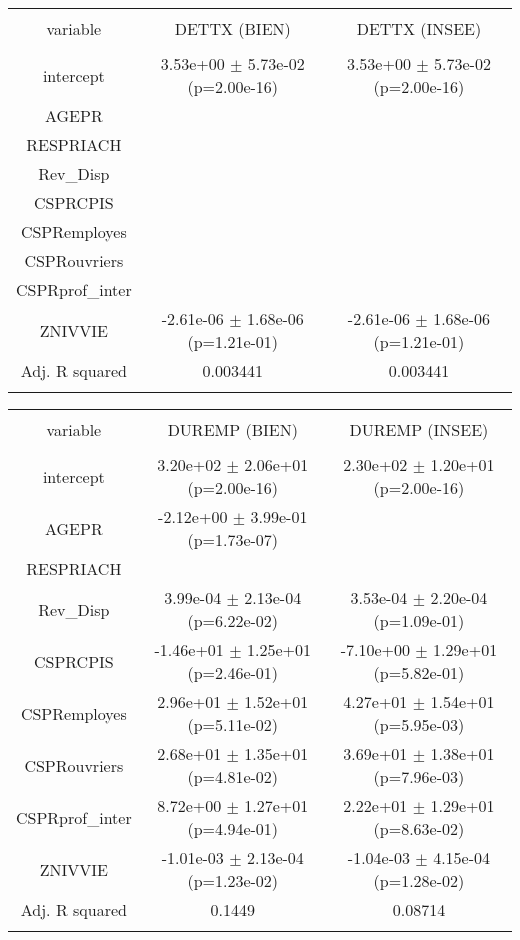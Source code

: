 \begin{table*}[!htbp] \centering 
  \caption{} 
  \label{} 
\begin{tabular}{@{\extracolsep{5pt}} ccc} 
\\[-1.8ex]\hline 
\hline \\[-1.8ex] 
variable & DETTX (BIEN) & DETTX (INSEE) \\ 
\hline \\[-1.8ex] 
intercept &  3.53e+00 $\pm$ 5.73e-02 (p=2.00e-16) &  3.53e+00 $\pm$ 5.73e-02 (p=2.00e-16) \\ 
AGEPR &  &  \\ 
RESPRIACH &  &  \\ 
Rev\_Disp &  &  \\ 
CSPRCPIS &  &  \\ 
CSPRemployes &  &  \\ 
CSPRouvriers &  &  \\ 
CSPRprof\_inter &  &  \\ 
ZNIVVIE & -2.61e-06 $\pm$ 1.68e-06 (p=1.21e-01) & -2.61e-06 $\pm$ 1.68e-06 (p=1.21e-01) \\ 
\hline Adj. R squared & 0.003441 & 0.003441 \\ 
\hline \\[-1.8ex] 
\end{tabular} 
\end{table*} 



\begin{table*}[!htbp] \centering 
  \caption{} 
  \label{} 
\begin{tabular}{@{\extracolsep{5pt}} ccc} 
\\[-1.8ex]\hline 
\hline \\[-1.8ex] 
variable & DUREMP (BIEN) & DUREMP (INSEE) \\ 
\hline \\[-1.8ex] 
intercept &  3.20e+02 $\pm$ 2.06e+01 (p=2.00e-16) &  2.30e+02 $\pm$ 1.20e+01 (p=2.00e-16) \\ 
AGEPR & -2.12e+00 $\pm$ 3.99e-01 (p=1.73e-07) &  \\ 
RESPRIACH &  &  \\ 
Rev\_Disp &  3.99e-04 $\pm$ 2.13e-04 (p=6.22e-02) &  3.53e-04 $\pm$ 2.20e-04 (p=1.09e-01) \\ 
CSPRCPIS & -1.46e+01 $\pm$ 1.25e+01 (p=2.46e-01) & -7.10e+00 $\pm$ 1.29e+01 (p=5.82e-01) \\ 
CSPRemployes &  2.96e+01 $\pm$ 1.52e+01 (p=5.11e-02) &  4.27e+01 $\pm$ 1.54e+01 (p=5.95e-03) \\ 
CSPRouvriers &  2.68e+01 $\pm$ 1.35e+01 (p=4.81e-02) &  3.69e+01 $\pm$ 1.38e+01 (p=7.96e-03) \\ 
CSPRprof\_inter &  8.72e+00 $\pm$ 1.27e+01 (p=4.94e-01) &  2.22e+01 $\pm$ 1.29e+01 (p=8.63e-02) \\ 
ZNIVVIE & -1.01e-03 $\pm$ 2.13e-04 (p=1.23e-02) & -1.04e-03 $\pm$ 4.15e-04 (p=1.28e-02) \\ 
\hline Adj. R squared & 0.1449 & 0.08714 \\ 
\hline \\[-1.8ex] 
\end{tabular} 
\end{table*} 


